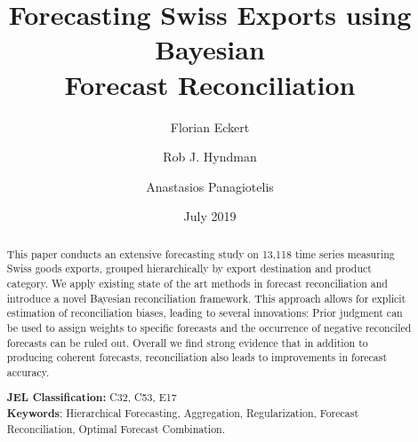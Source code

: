 


\title{\huge Forecasting Swiss Exports using Bayesian \\Forecast Reconciliation}

\author[$\dagger$]{Florian Eckert}
\author[$\ddagger$]{Rob J. Hyndman}
\author[$\ddagger$]{Anastasios Panagiotelis}
\date{July 2019}

\maketitle
\begin{abstract}
\noindent This paper conducts an extensive forecasting study on 13,118 time series measuring Swiss goods exports, grouped hierarchically by export destination and product category.  We apply existing state of the art methods in forecast reconciliation and introduce a novel Bayesian reconciliation framework. This approach allows for explicit estimation of reconciliation biases, leading to several innovations: Prior judgment can be used to assign weights to specific forecasts and the occurrence of negative reconciled forecasts can be ruled out. Overall we find strong evidence that in addition to producing coherent forecasts, reconciliation also leads to improvements in forecast accuracy.

\noindent \textbf{JEL Classification:} C32, C53, E17\\
\noindent \textbf{Keywords}: Hierarchical Forecasting, Aggregation, Regularization, Forecast Reconciliation, Optimal Forecast Combination.
\end{abstract}
\clearpage










